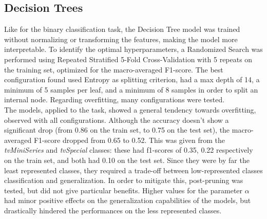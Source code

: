 \subsection{Decision Trees}
Like for the binary classification task, the Decision Tree model was trained without normalizing or
transforming the features, making the model more interpretable.
To identify the optimal hyperparameters, a Randomized Search was performed
using Repeated Stratified 5-Fold Cross-Validation with 5 repeats on the training set, optimized for
the macro-averaged F1-score.
The best configuration found used Entropy as splitting criterion, had a max depth of 14, a minimum of
5 samples per leaf, and a minimum of 8 samples in order to split an internal node.
Regarding overfitting, many configurations were tested.\\

The models, applied to the task, showed a general tendency towards overfitting,
observed with all configurations. Although the accuracy doesn't show a significant drop (from 0.86 on the
train set, to 0.75 on the test set), the macro-averaged F1-score dropped from 0.65 to 0.52.
This was given from the \textit{tvMiniSeries} and \textit{tvSpecial} classes: these had f1-scores of
0.35, 0.22 respectively on the train set, and both had 0.10 on the test set. Since they were by far
the least represented classes, they required a trade-off between low-represented classes classification
and generalization.
In order to mitigate this, post-pruning was tested, but did not give particular benefits.
Higher values for the parameter $\alpha$ had minor positive effects on the generalization
capabilities of the models, but drastically hindered the performances on the less represented classes.


